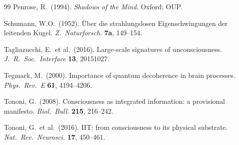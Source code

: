 \documentclass[12pt,a4paper]{article}
\numberwithin{equation}{section}
\begin{document}
\begin{thebibliography}{99}
Penrose, R.\ (1994). \textit{Shadows of the Mind}. Oxford: OUP.

Schumann, W.O.\ (1952). {\"U}ber die strahlungslosen Eigenschwingungen der leitenden Kugel.
\textit{Z.\ Naturforsch.} \textbf{7a}, 149--154.

Tagliazucchi, E.\ et al.\ (2016). Large-scale signatures of unconsciousness.
\textit{J.\ R.\ Soc.\ Interface} \textbf{13}, 20151027.

Tegmark, M.\ (2000). Importance of quantum decoherence in brain processes.
\textit{Phys.\ Rev.\ E} \textbf{61}, 4194--4206.

Tononi, G.\ (2008). Consciousness as integrated information: a provisional manifesto.
\textit{Biol.\ Bull.} \textbf{215}, 216--242.

Tononi, G.\ et al.\ (2016). IIT: from consciousness to its physical substrate.
\textit{Nat.\ Rev.\ Neurosci.} \textbf{17}, 450--461.

\end{thebibliography}
\end{document}
